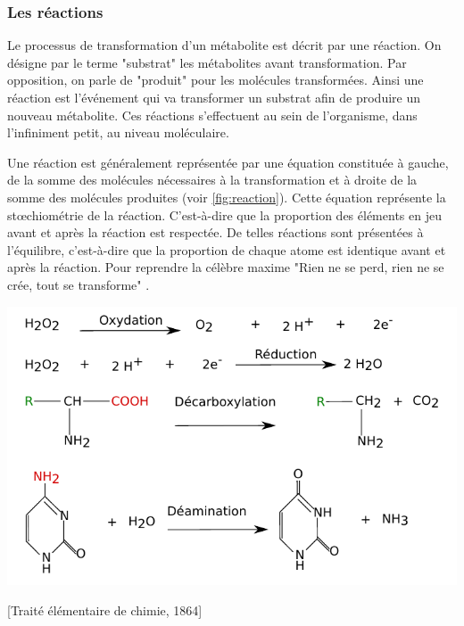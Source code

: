\begin{refsegment}
	\subsubsection{Les réactions}
	Le processus de transformation d'un métabolite est décrit par une réaction. On désigne par le terme "substrat" les métabolites avant transformation. Par opposition, on parle de "produit" pour les molécules transformées. Ainsi une réaction est l'événement qui va transformer un substrat afin de produire un nouveau métabolite. Ces réactions s'effectuent au sein de l'organisme, dans l'infiniment petit, au niveau moléculaire.
    
    Une réaction est généralement représentée par une équation constituée à gauche, de la somme des molécules nécessaires à la transformation et à droite de la somme des molécules produites (voir \cref{fig:reaction}). Cette équation  représente la stœchiométrie de la réaction. C'est-à-dire que la proportion des éléments en jeu avant et après la réaction est respectée. De telles réactions sont présentées à l'équilibre, c'est-à-dire que la proportion de chaque atome est identique avant et après la réaction. Pour reprendre la célèbre maxime "Rien ne se perd, rien ne se crée, tout se transforme" .
    
    \begin{shadedfigure}[H]
        \centering
        \includegraphics[width=\textwidth]{img/equation_reaction.pdf}
        \caption{Représentation de réactions sous leur forme "équation-bilan" .}
        \label{fig:reaction}
    \end{shadedfigure}
    
    [Traité élémentaire de chimie, 1864]
    

\end{refsegment}
